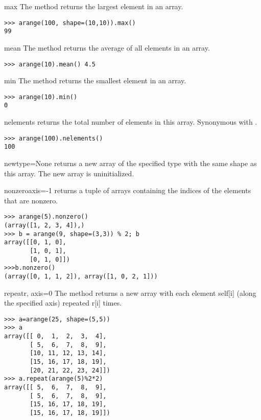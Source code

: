 \begin{methoddesc}[numarray]{max}{}
  \label{arraymethod:max}
  The  method returns the largest element in an array.
\begin{verbatim}
>>> arange(100, shape=(10,10)).max()
99
\end{verbatim}
\end{methoddesc}
\begin{methoddesc}[numarray]{mean}{}
  \label{arraymethod:mean}
  The  method returns the average of all elements in an array.
\begin{verbatim}
>>> arange(10).mean() 4.5
\end{verbatim}
\end{methoddesc}
\begin{methoddesc}[numarray]{min}{}
  \label{arraymethod:min}
  The  method returns the smallest element in an array.
\begin{verbatim}
>>> arange(10).min()
0
\end{verbatim}
\end{methoddesc}


\begin{methoddesc}[numarray]{nelements}{}
  \label{arraymethod:nelements}
   returns the total number of elements in this array.
  Synonymous with .
\begin{verbatim}
>>> arange(100).nelements()
100
\end{verbatim}
\end{methoddesc}


\begin{methoddesc}[numarray]{new}{type=None}
  \label{arraymethod:new}
    returns a new array of the specified type with the same shape
   as this array.  The new array is uninitialized.
\end{methoddesc}


\begin{methoddesc}[numarray]{nonzero}{axis=-1}
  \label{arraymethod:nonzero}
    returns a tuple of arrays containing the indices of the
   elements that are nonzero.
\begin{verbatim}
>>> arange(5).nonzero()
(array([1, 2, 3, 4]),)
>>> b = arange(9, shape=(3,3)) % 2; b
array([[0, 1, 0],
       [1, 0, 1],
       [0, 1, 0]])
>>>b.nonzero()
(array([0, 1, 1, 2]), array([1, 0, 2, 1]))
\end{verbatim}
\end{methoddesc}


\begin{methoddesc}[numarray]{repeat}{r, axis=0}
  \label{arraymethod:repeat}
   The  method returns a new array with each element self[i]
   (along the specified axis) repeated r[i] times.
\begin{verbatim}
>>> a=arange(25, shape=(5,5))
>>> a
array([[ 0,  1,  2,  3,  4],
       [ 5,  6,  7,  8,  9],
       [10, 11, 12, 13, 14],
       [15, 16, 17, 18, 19],
       [20, 21, 22, 23, 24]])
>>> a.repeat(arange(5)%2*2)
array([[ 5,  6,  7,  8,  9],
       [ 5,  6,  7,  8,  9],
       [15, 16, 17, 18, 19],
       [15, 16, 17, 18, 19]])
\end{verbatim}
\end{methoddesc}


